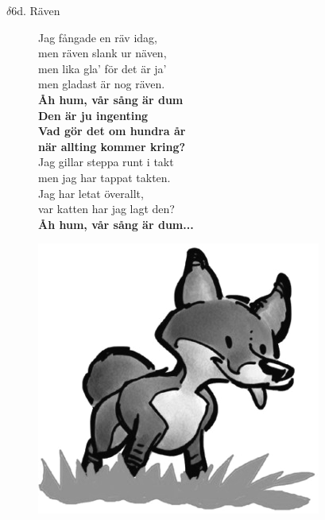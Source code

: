 \documentclass[a6paper,10pt]{article}
\begin{document}
\newpage
\setlength{\oddsidemargin}{-0.37in}
\noindent
\begin{center}
\Large $\delta6$d. Räven\\ 
\end{center}
\vspace{-15pt}
\begin{figure}[!h]
\begin{minipage}{0.65\linewidth}
\small Jag fångade en räv idag, \\
men räven slank ur näven, \\
men lika gla' för det är ja' \\
men gladast är nog räven. 
\vspace{5pt}\\
\textbf{Åh hum, vår sång är dum\\
Den är ju ingenting\\
Vad gör det om hundra år\\
när allting kommer kring?}
\vspace{5pt}\\
Jag gillar steppa runt i takt \\
men jag har tappat takten. \\
Jag har letat överallt, \\
var katten har jag lagt den? 
\vspace{5pt}\\
\textbf{Åh hum, vår sång är dum...}
\end{minipage}
\begin{minipage}{0.3\linewidth}
\includegraphics[width=\textwidth]{fox.png}
\end{minipage}
\end{figure}
\end{document}
